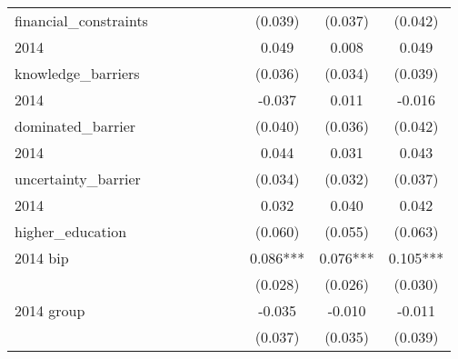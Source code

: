 \begin{table}[htbp]
\begin{tabular}{l*{9}{c}}
financial\_constraints&               &               &               &               &               &               &     (0.039)   &     (0.037)   &     (0.042)   \\
2014                &               &               &               &               &               &               &       0.049   &       0.008   &       0.049   \\
knowledge\_barriers  &               &               &               &               &               &               &     (0.036)   &     (0.034)   &     (0.039)   \\
2014                &               &               &               &               &               &               &      -0.037   &       0.011   &      -0.016   \\
dominated\_barrier   &               &               &               &               &               &               &     (0.040)   &     (0.036)   &     (0.042)   \\
2014                &               &               &               &               &               &               &       0.044   &       0.031   &       0.043   \\
uncertainty\_barrier &               &               &               &               &               &               &     (0.034)   &     (0.032)   &     (0.037)   \\
2014                &               &               &               &               &               &               &       0.032   &       0.040   &       0.042   \\
higher\_education    &               &               &               &               &               &               &     (0.060)   &     (0.055)   &     (0.063)   \\
2014 bip            &               &               &               &               &               &               &       0.086***&       0.076***&       0.105***\\
                    &               &               &               &               &               &               &     (0.028)   &     (0.026)   &     (0.030)   \\
2014 group          &               &               &               &               &               &               &      -0.035   &      -0.010   &      -0.011   \\
                    &               &               &               &               &               &               &     (0.037)   &     (0.035)   &     (0.039)   \\

\end{tabular}
\end{table}
